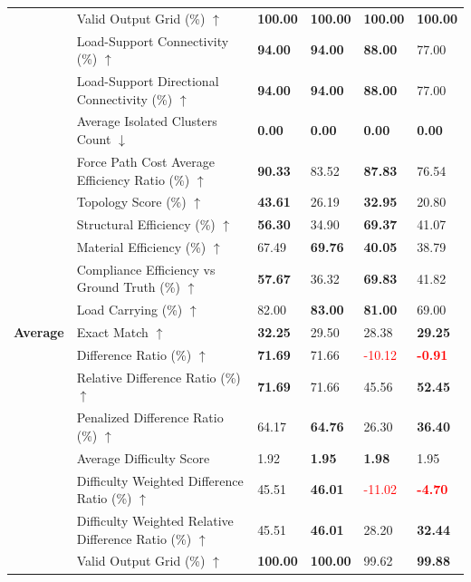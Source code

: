 \begin{table}[!h]
{\begin{tabular}{llll|ll}
 & Valid Output Grid (\%) $\uparrow$ & \textbf{100.00} & \textbf{100.00} & \textbf{100.00} & \textbf{100.00} \\
 & Load-Support Connectivity (\%) $\uparrow$ & \textbf{94.00} & \textbf{94.00} & \textbf{88.00} & 77.00 \\
 & Load-Support Directional Connectivity (\%) $\uparrow$ & \textbf{94.00} & \textbf{94.00} & \textbf{88.00} & 77.00 \\
 & Average Isolated Clusters Count $\downarrow$ & \textbf{0.00} & \textbf{0.00} & \textbf{0.00} & \textbf{0.00} \\
 & Force Path Cost Average Efficiency Ratio (\%) $\uparrow$ & \textbf{90.33} & 83.52 & \textbf{87.83} & 76.54 \\
 & Topology Score (\%) $\uparrow$ & \textbf{43.61} & 26.19 & \textbf{32.95} & 20.80 \\
 & Structural Efficiency (\%) $\uparrow$ & \textbf{56.30} & 34.90 & \textbf{69.37} & 41.07 \\
 & Material Efficiency (\%) $\uparrow$ & 67.49 & \textbf{69.76} & \textbf{40.05} & 38.79 \\
 & Compliance Efficiency vs Ground Truth (\%) $\uparrow$ & \textbf{57.67} & 36.32 & \textbf{69.83} & 41.82 \\
 & Load Carrying (\%) $\uparrow$ & 82.00 & \textbf{83.00} & \textbf{81.00} & 69.00 \\
\midrule
\textbf{Average} & Exact Match $\uparrow$ & \textbf{32.25} & 29.50 & 28.38 & \textbf{29.25} \\
 & Difference Ratio (\%) $\uparrow$ & \textbf{71.69} & 71.66 & \textcolor{red}{-10.12} & \textbf{\textcolor{red}{-0.91}} \\
 & Relative Difference Ratio (\%) $\uparrow$ & \textbf{71.69} & 71.66 & 45.56 & \textbf{52.45} \\
 & Penalized Difference Ratio (\%) $\uparrow$ & 64.17 & \textbf{64.76} & 26.30 & \textbf{36.40} \\
 & Average Difficulty Score & 1.92 & \textbf{1.95} & \textbf{1.98} & 1.95 \\
 & Difficulty Weighted Difference Ratio (\%) $\uparrow$ & 45.51 & \textbf{46.01} & \textcolor{red}{-11.02} & \textbf{\textcolor{red}{-4.70}} \\
 & Difficulty Weighted Relative Difference Ratio (\%) $\uparrow$ & 45.51 & \textbf{46.01} & 28.20 & \textbf{32.44} \\
 & Valid Output Grid (\%) $\uparrow$ & \textbf{100.00} & \textbf{100.00} & 99.62 & \textbf{99.88} \\

\end{tabular}}
\end{table}
